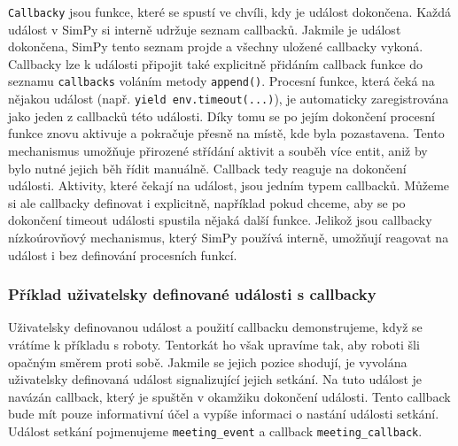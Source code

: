 \documentclass[
  program=itp,
  biblatex,
  figures=false,
  glossaries,
  index
]{kidiplom}
\begin{document}
\texttt{Callbacky} jsou funkce, které se spustí ve chvíli, kdy je událost dokončena. Každá událost v SimPy si interně udržuje seznam callbacků. Jakmile je událost dokončena, SimPy tento seznam projde a všechny uložené callbacky vykoná. Callbacky lze k události připojit také explicitně přidáním callback funkce do seznamu \texttt{callbacks} voláním metody \texttt{append()}. Procesní funkce, která čeká na nějakou událost (např. \texttt{yield env.timeout(...)}), je automaticky zaregistrována jako jeden z callbacků této události. Díky tomu se po jejím dokončení procesní funkce znovu aktivuje a pokračuje přesně na místě, kde byla pozastavena. Tento mechanismus umožňuje přirozené střídání aktivit a souběh více entit, aniž by bylo nutné jejich běh řídit manuálně. Callback tedy reaguje na dokončení události. Aktivity, které čekají na událost, jsou jedním typem callbacků. Můžeme si ale callbacky definovat i explicitně, například pokud chceme, aby se po dokončení timeout události spustila nějaká další funkce. Jelikož jsou callbacky nízkoúrovňový mechanismus, který SimPy používá interně, umožňují reagovat na událost i bez definování procesních funkcí.

\subsubsection{Příklad uživatelsky definované události s callbacky}
Uživatelsky definovanou událost a použití callbacku demonstrujeme, když se vrátíme k příkladu s roboty. Tentorkát ho však upravíme tak, aby roboti šli opačným směrem proti sobě. Jakmile se jejich pozice shodují, je vyvolána uživatelsky definovaná událost signalizující jejich setkání. Na tuto událost je navázán callback, který je spuštěn v okamžiku dokončení události. Tento callback bude mít pouze informativní účel a vypíše informaci o nastání události setkání. Událost setkání pojmenujeme \texttt{meeting\_event} a callback \texttt{meeting\_callback}. 
\end{document}
